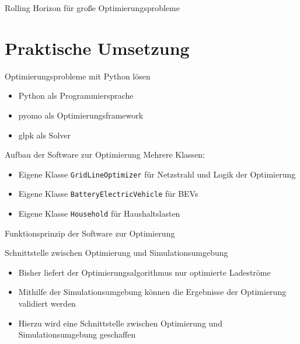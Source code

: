 \documentclass[aspectratio=169]{beamer}
\begin{document}
\begin{frame}{Rolling Horizon für große Optimierungsprobleme}
	\begin{figure}
		\centering
		
	\end{figure}
\end{frame}


\section{Praktische Umsetzung}

\begin{frame}{Optimierungsprobleme mit Python lösen}
	\begin{itemize}
		\item Python als Programmiersprache
		\item pyomo als Optimierungsframework
		\item glpk als Solver
	\end{itemize}
\end{frame}


\begin{frame}{Aufbau der Software zur Optimierung}
	Mehrere Klassen:
	\begin{itemize}
		\item Eigene Klasse \texttt{GridLineOptimizer} für Netzstrahl und 
		Logik der Optimierung
		\item Eigene Klasse \texttt{BatteryElectricVehicle} für BEVs
		\item Eigene Klasse \texttt{Household} für Haushaltslasten
	\end{itemize}
	
\end{frame}


\begin{frame}{Funktionsprinzip der Software zur Optimierung}
	\begin{figure}
		\centering
		
	\end{figure}
\end{frame}


\begin{frame}{Schnittstelle zwischen Optimierung und Simulationsumgebung}
	\begin{itemize}
		\item Bisher liefert der Optimierungsalgorithmus nur optimierte
		Ladeströme
		\item Mithilfe der Simulationsumgebung können die Ergebnisse
		der Optimierung validiert werden
		\item Hierzu wird eine Schnittstelle zwischen Optimierung und
		Simulationsumgebung geschaffen
	\end{itemize}
\end{frame}
\end{document}
